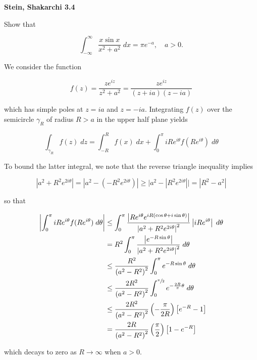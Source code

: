 \textbf{Stein, Shakarchi 3.4}

Show that

$$
\int_{-\infty}^{\infty} {\frac{x \sin x}{x^2 + a^2}} \; dx = \pi e^{-a}, \quad a > 0.
$$

\begin{solution}
  We consider the function 

  $$
  f(z) = \frac{z e^{iz}}{z^2 + a^2} = \frac{z e^{iz}}{(z + ia)(z - ia)}
  $$

  which has simple poles at $z = ia$ and $z = -ia$. Integrating $f(z)$ over the semicircle $\gamma_R$ of radius $R > a$ 
  in the upper half plane yields

  $$
  \int_{\gamma_R} { f(z) \; dz } = \int_{-R}^{R} { f(x) \; dx } 
                                 + \int_0^{\pi} { i R e^{i \theta} f(R e^{i \theta}) \; d\theta }
  $$

  To bound the latter integral, we note that the reverse triangle inequality implies

  $$
  \left|a^2 + R^2 e^{2 i \theta}\right| = \left|a^2 - \left(-R^2 e^{2 i \theta}\right)\right| 
                                      \ge \Big| a^2 - \left| R^2 e^{2 i \theta} \right| \Big| 
                                      = \left|R^2 - a^2\right|
  $$

  so that

  \begin{align*}
    \left| \int_0^{\pi} { i R e^{i \theta} f(R e^{i \theta}) \; d\theta } \right|
      &\le \int_0^{\pi} { \frac{\left| R e^{i \theta} e^{i R (\cos{\theta} + i \sin{\theta})} \right|}{\left| a^2 + R^2 e^{2 i \theta} \right|^2} \left| i R e^{i \theta} \right|\; d\theta } \\
      &= R^2 \int_0^{\pi} { \frac{\left| e^{-R \sin{\theta}} \right|}{\left| a^2 + R^2 e^{2 i \theta} \right|^2} \; d\theta } \\
      &\le \frac{R^2}{\left(a^2 - R^2\right)^2} \int_0^{\pi} { e^{-R \sin{\theta}} \; d\theta } \\
      &\le \frac{2 R^2}{\left(a^2 - R^2\right)^2} \int_0^{\sfrac{\pi}{2}} { e^{-\frac{2 R}{\pi} \theta} \; d\theta } \\
      &\le \frac{2 R^2}{\left(a^2 - R^2\right)^2} \left(-\frac{\pi}{2 R} \right) \left[ e^{-R} - 1 \right] \\
      &= \frac{2 R}{\left(a^2 - R^2\right)^2} \left(\frac{\pi}{2} \right) \left[ 1 - e^{-R} \right] 
  \end{align*}

  which decays to zero as $R \to \infty$ when $a > 0$. \pagebreak


\end{solution}
